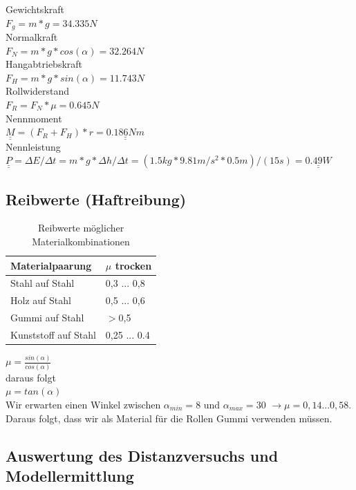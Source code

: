 \documentclass[a4paper]{report}
\begin{document}
\noindent
Gewichtskraft\\
$F_{g}=m*g=34.335 N$	\\
Normalkraft	\\
$F_{N}=m*g*cos(\alpha)=32.264 N$	\\
Hangabtriebskraft	\\
$F_{H}=m*g*sin(\alpha)=11.743 N$	\\
Rollwiderstand	\\
$F_{R}=F_{N}*\mu=0.645 N$	\\
Nennmoment	\\
$\underline{\underline{M}}=(F_{R}+F_{H})*r=\underline{\underline{0.186 Nm}}$	\\
Nennleistung	\\
$\underline{\underline{P}}=\Delta E/\Delta t=m*g*\Delta h/\Delta t=(1.5kg*9.81m/s^2*0.5m)/(15s)=\underline{\underline{0.49W}}$\\

\subsection{Reibwerte (Haftreibung)}
\label{ssec:ReibWer}

\begin{table}[h!]
	\centering
	\begin{tabular}{|p{}|p{}|}
		\hline
		\textbf{Materialpaarung} & \textbf{$\mu$ trocken}\\
		\hline
		Stahl auf Stahl & 0,3 ... 0,8 \\
		\hline
		Holz auf Stahl & 0,5 ... 0,6\\
		\hline
		Gummi auf Stahl & $>$0,5 \\
		\hline
		Kunststoff auf Stahl & 0,25 ... 0.4\\
		\hline
	\end{tabular}
	\caption{Reibwerte möglicher Materialkombinationen \parencite{Wittel2015}}
	\label{tab:Reibwerte}
\end{table}

\noindent
$\mu=\frac{sin(\alpha)}{cos(\alpha)}$\\

\noindent
daraus folgt\\
$\mu=tan(\alpha)$\\
Wir erwarten einen Winkel zwischen $\alpha_{min}=8$ und $\alpha_{max}=30$ $ \rightarrow \mu = 0,14 ... 0,58$. Daraus folgt, dass wir als Material für die Rollen Gummi verwenden müssen.

\subsection{Auswertung des Distanzversuchs und Modellermittlung}
\label{ssec:DistModelCreation}
\end{document}
